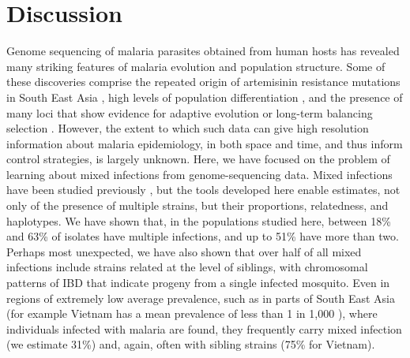 \documentclass[9pt,lineno]{elife}
\begin{document}
\section{Discussion}

Genome sequencing of malaria parasites obtained from human hosts has revealed many striking features of malaria evolution and population structure. Some of these discoveries comprise the repeated origin of artemisinin resistance mutations in South East Asia \citep{miotto2015genetic}, high levels of population differentiation \citep{Miotto2013}, and the presence of many loci that show evidence for adaptive evolution or long-term balancing selection \citep{Network2015}.  However, the extent to which such data can give high resolution information about malaria epidemiology, in both space and time, and thus inform control strategies, is largely unknown.  Here, we have focused on the problem of learning about mixed infections from genome-sequencing data.  Mixed infections have been studied previously \citep{auburn2012characterization, assefa2014estmoi,Galinsky2015, Jack2016}, but the tools developed here enable estimates, not only of the presence of multiple strains, but their proportions, relatedness, and haplotypes.  We have shown that, in the populations studied here, between 18\% and 63\% of isolates have multiple infections, and up to 51\% have more than two.  Perhaps most unexpected, we have also shown that over half of all mixed infections include strains related at the level of siblings, with chromosomal patterns of IBD that indicate progeny from a single infected mosquito.  Even in regions of extremely low average prevalence, such as in parts of South East Asia (for example Vietnam has a mean prevalence of less than 1 in 1,000 \citep{who2017profile,who2017}), where individuals infected with malaria are found, they frequently carry mixed infection (we estimate 31\%) and, again, often with sibling strains (75\% for Vietnam).

\end{document}
